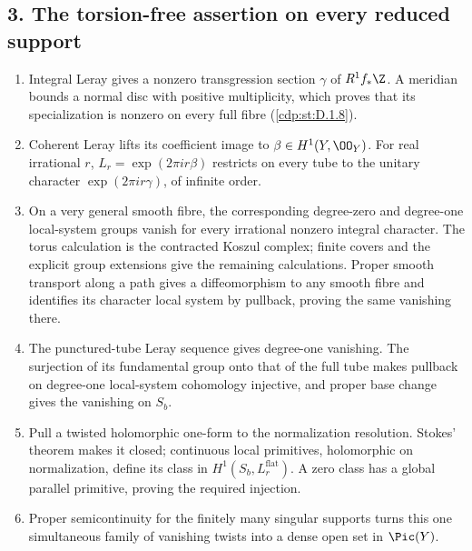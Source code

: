 \subsection*{3. The torsion-free assertion on every reduced support}
\RungOne
\begin{enumerate}[label=\arabic*.,leftmargin=*]
\item Integral Leray gives a nonzero transgression section
$\gamma$ of $R^1f_*\Z$.  A meridian bounds a normal disc with
positive multiplicity, which proves that its specialization is
nonzero on every full fibre (\ref{cdp:st:D.1.8}).
\item Coherent Leray lifts its coefficient image to
$\beta\in H^1(Y,\OO_Y)$.  For real irrational $r$,
$L_r=\exp(2\pi i r\beta)$ restricts on every tube to the unitary
character $\exp(2\pi i r\gamma)$, of infinite order.
\item On a very general smooth fibre, the corresponding degree-zero
and degree-one local-system groups vanish for every irrational nonzero
integral character. The torus calculation is the contracted Koszul
complex; finite covers and the explicit group extensions give the
remaining calculations. Proper smooth transport along a path gives a
diffeomorphism to any smooth fibre and identifies its character local
system by pullback, proving the same vanishing there.
\item The punctured-tube Leray sequence gives degree-one
vanishing.  The surjection of its fundamental group onto that of
the full tube makes pullback on degree-one local-system cohomology
injective, and proper base change gives the vanishing on $S_b$.
\item Pull a twisted holomorphic one-form to the normalization
resolution.  Stokes' theorem makes it closed; continuous local
primitives, holomorphic on normalization, define its class in
$H^1(S_b,L_r^{\mathrm{flat}})$.  A zero class has a global
parallel primitive, proving the required injection.
\item Proper semicontinuity for the finitely many singular
supports turns this one simultaneous family of vanishing twists
into a dense open set in $\Pic(Y)$.
\end{enumerate}

